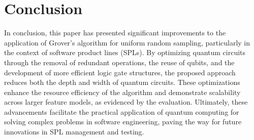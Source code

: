 \section{Conclusion}
In conclusion, this paper has presented significant improvements to the application of Grover's algorithm for uniform random sampling, particularly in the context of software product lines (SPLs).
By optimizing quantum circuits through the removal of redundant operations, the reuse of qubits, and the development of more efficient logic gate structures, the proposed approach reduces both the depth and width of quantum circuits. 
These optimizations enhance the resource efficiency of the algorithm and demonstrate scalability across larger feature models, as evidenced by the evaluation. 
Ultimately, these advancements facilitate the practical application of quantum computing for solving complex problems in software engineering, paving the way for future innovations in SPL management and testing.